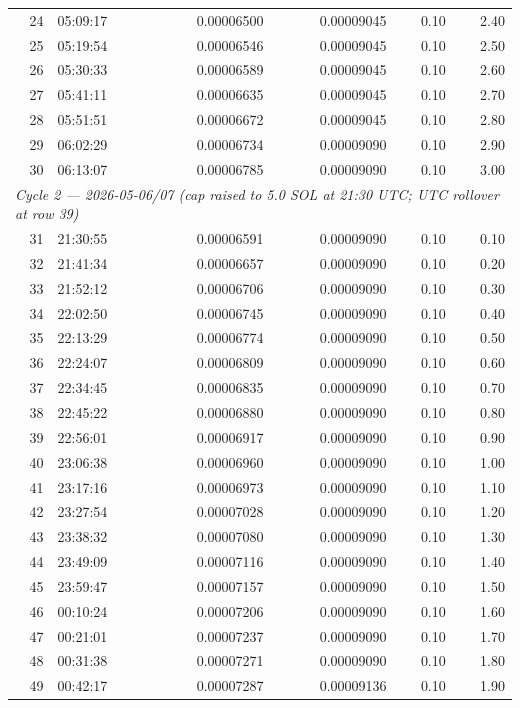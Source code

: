 \documentclass[11pt,a4paper]{article}
\begin{document}
\begin{table}[h]
\begin{tabular}{rlrrrr}
24 & 05:09:17 & 0.00006500 & 0.00009045 & 0.10 & 2.40 \\
25 & 05:19:54 & 0.00006546 & 0.00009045 & 0.10 & 2.50 \\
26 & 05:30:33 & 0.00006589 & 0.00009045 & 0.10 & 2.60 \\
27 & 05:41:11 & 0.00006635 & 0.00009045 & 0.10 & 2.70 \\
28 & 05:51:51 & 0.00006672 & 0.00009045 & 0.10 & 2.80 \\
29 & 06:02:29 & 0.00006734 & 0.00009090 & 0.10 & 2.90 \\
30 & 06:13:07 & 0.00006785 & 0.00009090 & 0.10 & 3.00 \\
\midrule
\multicolumn{6}{l}{\emph{Cycle 2 --- 2026-05-06/07 (cap raised to 5.0 SOL at 21:30 UTC; UTC rollover at row 39)}} \\
31 & 21:30:55 & 0.00006591 & 0.00009090 & 0.10 & 0.10 \\
32 & 21:41:34 & 0.00006657 & 0.00009090 & 0.10 & 0.20 \\
33 & 21:52:12 & 0.00006706 & 0.00009090 & 0.10 & 0.30 \\
34 & 22:02:50 & 0.00006745 & 0.00009090 & 0.10 & 0.40 \\
35 & 22:13:29 & 0.00006774 & 0.00009090 & 0.10 & 0.50 \\
36 & 22:24:07 & 0.00006809 & 0.00009090 & 0.10 & 0.60 \\
37 & 22:34:45 & 0.00006835 & 0.00009090 & 0.10 & 0.70 \\
38 & 22:45:22 & 0.00006880 & 0.00009090 & 0.10 & 0.80 \\
39 & 22:56:01 & 0.00006917 & 0.00009090 & 0.10 & 0.90 \\
40 & 23:06:38 & 0.00006960 & 0.00009090 & 0.10 & 1.00 \\
41 & 23:17:16 & 0.00006973 & 0.00009090 & 0.10 & 1.10 \\
42 & 23:27:54 & 0.00007028 & 0.00009090 & 0.10 & 1.20 \\
43 & 23:38:32 & 0.00007080 & 0.00009090 & 0.10 & 1.30 \\
44 & 23:49:09 & 0.00007116 & 0.00009090 & 0.10 & 1.40 \\
45 & 23:59:47 & 0.00007157 & 0.00009090 & 0.10 & 1.50 \\
46 & 00:10:24 & 0.00007206 & 0.00009090 & 0.10 & 1.60 \\
47 & 00:21:01 & 0.00007237 & 0.00009090 & 0.10 & 1.70 \\
48 & 00:31:38 & 0.00007271 & 0.00009090 & 0.10 & 1.80 \\
49 & 00:42:17 & 0.00007287 & 0.00009136 & 0.10 & 1.90 \\

\end{tabular}
\end{table}
\end{document}
